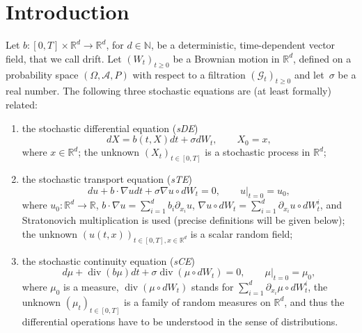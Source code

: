\documentclass[a4paper,10pt]{article}
\newcommand\1{\mathbbm{1}}
\DeclareMathOperator{\diverg}{div}
\numberwithin{equation}{section}
\begin{document}

\section{Introduction}

Let $b \colon [ 0,T] \times\mathbb{R}^{d}\rightarrow\mathbb{R}^{d}$, for $d \in \mathbb{N}$, be a deterministic, time-dependent vector field, that we call drift. Let $(W_{t}) _{t\geq0}$ be a Brownian motion in $\mathbb{R}^{d}$, defined on a probability space $(\Omega,\mathcal{A},P)$ with respect to a filtration $(\mathcal{G}_{t}) _{t\geq0}$ and let~$\sigma$ be a real number. The following three stochastic equations are (at least formally) related:
\begin{enumerate}
  \item the stochastic differential equation (\textit{sDE}) 
  \begin{equation}
  dX =b(t,X ) dt+\sigma dW_{t},\qquad X_{0}=x , \tag{sDE}
  \label{SDE}
  \end{equation}
  where $x\in\mathbb{R}^{d}$; the unknown $(X_{t}) _{t\in [0,T]}$ is a stochastic process in $\mathbb{R}^{d}$;
  \item the stochastic transport equation (\textit{sTE})
  \begin{equation}
  du+b\cdot\nabla udt+\sigma\nabla u\circ dW_{t}=0,\qquad u|_{t=0}=u_{0} , 
  \tag{sTE}  \label{stoch transport}
  \end{equation}
  where $u_{0} \colon \mathbb{R}^{d}\rightarrow\mathbb{R}$, 
  $b\cdot\nabla u=\sum_{i=1}^{d}b_{i}\partial_{x_{i}}u$, $\nabla u\circ dW_{t}=\sum_{i=1}^{d}\partial_{x_{i}}u\circ dW_{t}^{i}$, and Stratonovich multiplication is used (precise definitions will be given below); the unknown $(u(t,x))_{t\in [ 0,T] ,x\in \mathbb{R}^{d}}$ is a scalar random field;
  \item the stochastic continuity equation (\textit{sCE}) 
  \begin{equation}
  d\mu +\diverg(b\mu) dt+\sigma \diverg 
  (\mu \circ dW_{t}) =0,\qquad\mu|_{t=0}=\mu_{0} , \tag{sCE}
  \label{stoch cont}
  \end{equation}
  where $\mu_{0}$ is a measure, $\diverg (\mu \circ dW_{t})$ stands for $\sum_{i=1}^{d}\partial_{x_{i}}\mu \circ dW_{t}^{i}$, the unknown $(\mu_{t}) _{t\in [ 0,T] }$ is a family of random measures on $\mathbb{R}^{d}$, and thus the differential operations have to be understood in the sense of distributions.
\end{enumerate}
\end{document}
